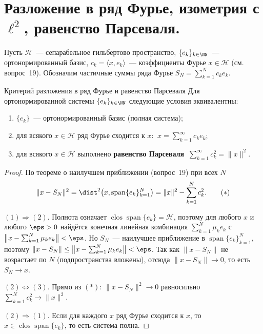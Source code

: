 
\section{Разложение в ряд Фурье, изометрия с $\ell^2$, равенство Парсеваля.}

Пусть $\mathcal{H}$~--- сепарабельное гильбертово пространство, $\{e_k\}_{k \in \NN}$~--- ортонормированный базис, $c_k = \langle x, e_k\rangle$~--- коэффициенты Фурье $x \in \mathcal{H}$ (см. вопрос~19). Обозначим частичные суммы ряда Фурье $S_N = \sum_{k=1}^{N} c_k e_k$.

\begin{Theorem}{Критерий разложения в ряд Фурье и равенство Парсеваля}{}
	Для ортонормированной системы $\{e_k\}_{k \in \NN}$ следующие условия эквивалентны:
	\begin{enumerate}
		\item $\{e_k\}$~--- ортонормированный базис (полная система);
		\item для всякого $x \in \mathcal{H}$ ряд Фурье сходится к $x$: $\ x = \sum_{k=1}^{\infty} c_k e_k$;
		\item для всякого $x \in \mathcal{H}$ выполнено \textbf{равенство Парсеваля} $\ \displaystyle\sum_{k=1}^{\infty} c_k^2 = \|x\|^2$.
	\end{enumerate}
\end{Theorem}

\begin{proof}
	По теореме о наилучшем приближении (вопрос~19) при всех $N$
	\[
	\|x - S_N\|^2 = \dist^2\bigl(x, \operatorname{span}\{e_k\}_{k=1}^{N}\bigr) = \|x\|^2 - \sum_{k=1}^{N} c_k^2. \tag{$\ast$}
	\]

	$(1)\Rightarrow(2)$. Полнота означает $\operatorname{clos}\operatorname{span}\{e_k\} = \mathcal{H}$, поэтому для любого $x$ и любого $\eps > 0$ найдётся конечная линейная комбинация $\sum_{k=1}^{N}\mu_k e_k$ с $\bigl\|x - \sum_{k=1}^{N}\mu_k e_k\bigr\| < \eps$. Но $S_N$~--- наилучшее приближение в $\operatorname{span}\{e_k\}_{k=1}^{N}$, поэтому $\|x - S_N\| \le \bigl\|x - \sum_{k=1}^{N}\mu_k e_k\bigr\| < \eps$. Так как $\|x - S_N\|$ не возрастает по $N$ (подпространства вложены), отсюда $\|x - S_N\| \to 0$, то есть $S_N \to x$.

	$(2)\Leftrightarrow(3)$. Прямо из $(\ast)$: $\|x - S_N\|^2 \to 0$ равносильно $\sum_{k=1}^{N} c_k^2 \to \|x\|^2$.

	$(2)\Rightarrow(1)$. Если для каждого $x$ ряд Фурье сходится к $x$, то $x \in \operatorname{clos}\operatorname{span}\{e_k\}$, то есть система полна.
\end{proof}

